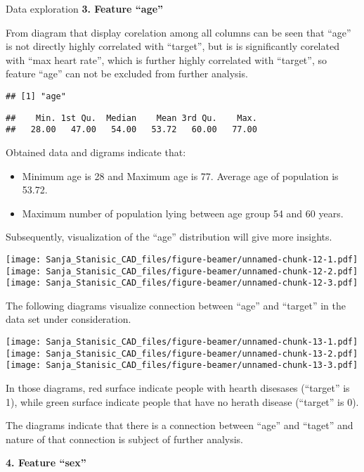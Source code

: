 \documentclass[
  ignorenonframetext,
]{beamer}
\begin{document}
\begin{frame}[fragile]{Data exploration}
\textbf{3. Feature ``age''}

From diagram that display corelation among all columns can be seen that
``age'' is not directly highly correlated with ``target'', but is is
significantly corelated with ``max heart rate'', which is further highly
correlated with ``target'', so feature ``age'' can not be excluded from
further analysis.

\begin{verbatim}
## [1] "age"
\end{verbatim}

\begin{verbatim}
##    Min. 1st Qu.  Median    Mean 3rd Qu.    Max. 
##   28.00   47.00   54.00   53.72   60.00   77.00
\end{verbatim}

Obtained data and digrams indicate that:

\begin{itemize}
\item
  Minimum age is 28 and Maximum age is 77. Average age of population is
  53.72.
\item
  Maximum number of population lying between age group 54 and 60 years.
\end{itemize}

Subsequently, visualization of the ``age'' distribution will give more
insights.

\texttt{[image: Sanja\_Stanisic\_CAD\_files/figure-beamer/unnamed-chunk-12-1.pdf]}
\texttt{[image: Sanja\_Stanisic\_CAD\_files/figure-beamer/unnamed-chunk-12-2.pdf]}
\texttt{[image: Sanja\_Stanisic\_CAD\_files/figure-beamer/unnamed-chunk-12-3.pdf]}

The following diagrams visualize connection between ``age'' and
``target'' in the data set under consideration.

\texttt{[image: Sanja\_Stanisic\_CAD\_files/figure-beamer/unnamed-chunk-13-1.pdf]}
\texttt{[image: Sanja\_Stanisic\_CAD\_files/figure-beamer/unnamed-chunk-13-2.pdf]}
\texttt{[image: Sanja\_Stanisic\_CAD\_files/figure-beamer/unnamed-chunk-13-3.pdf]}

In those diagrams, red surface indicate people with hearth disesases
(``target'' is 1), while green surface indicate people that have no
herath disease (``target'' is 0).

The diagrams indicate that there is a connection between ``age'' and
``taget'' and nature of that connection is subject of further analysis.

\textbf{4. Feature ``sex''}


\end{frame}
\end{document}
